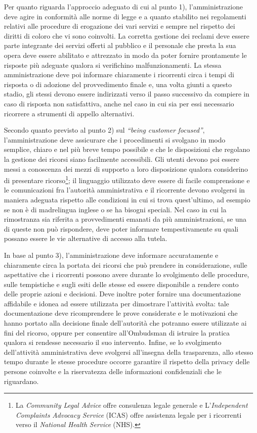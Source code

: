 \documentclass[12pt,it,a4paper,]{report}
\begin{document}
Per quanto riguarda l'approccio adeguato di cui al punto 1),
l'amministrazione deve agire in conformità alle norme di legge e a
quanto stabilito nei regolamenti relativi alle procedure di erogazione
dei vari servizi e sempre nel rispetto dei diritti di coloro che vi sono
coinvolti. La corretta gestione dei reclami deve essere parte integrante
dei servizi offerti al pubblico e il personale che presta la sua opera
deve essere abilitato e attrezzato in modo da poter fornire prontamente
le risposte più adeguate qualora si verifichino malfunzionamenti. La
stessa amministrazione deve poi informare chiaramente i ricorrenti circa
i tempi di risposta o di adozione del provvedimento finale e, una volta
giunti a questo stadio, gli stessi devono essere indirizzati verso il
passo successivo da compiere in caso di risposta non satisfattiva, anche
nel caso in cui sia per essi necessario ricorrere a strumenti di appello
alternativi.

Secondo quanto previsto al punto 2) sul \emph{``being customer
focused''}, l'amministrazione deve assicurare che i procedimenti si
svolgano in modo semplice, chiaro e nel più breve tempo possibile e che
le disposizioni che regolano la gestione dei ricorsi siano facilmente
accessibili. Gli utenti devono poi essere messi a conoscenza dei mezzi
di supporto a loro disposizione qualora considerino di presentare
ricorso\footnote{La \emph{Community Legal Advice} offre consulenza
  legale generale e L'\emph{Independent Complaints Advocacy Service}
  (ICAS) offre assistenza legale per i ricorrenti verso il
  \emph{National Health Service} (NHS).}; il linguaggio utilizzato deve
essere di facile comprensione e le comunicazioni fra l'autorità
amministrativa e il ricorrente devono svolgersi in maniera adeguata
rispetto alle condizioni in cui si trova quest'ultimo, ad esempio se non
è di madrelingua inglese o se ha bisogni speciali. Nel caso in cui la
rimostranza sia riferita a provvedimenti emanati da più amministrazioni,
se una di queste non può rispondere, deve poter informare
tempestivamente su quali possano essere le vie alternative di accesso
alla tutela.

In base al punto 3), l'amministrazione deve informare accuratamente e
chiaramente circa la portata dei ricorsi che può prendere in
considerazione, sulle aspettative che i ricorrenti possono avere durante
lo svolgimento delle procedure, sulle tempistiche e sugli esiti delle
stesse ed essere disponibile a rendere conto delle proprie azioni e
decisioni. Deve inoltre poter fornire una documentazione affidabile e
idonea ad essere utilizzata per dimostrare l'attività svolta: tale
documentazione deve ricomprendere le prove considerate e le motivazioni
che hanno portato alla decisione finale dell'autorità che potranno
essere utilizzate ai fini del ricorso, oppure per consentire
all'Ombudsman di istruire la pratica qualora si rendesse necessario il
suo intervento. Infine, se lo svolgimento dell'attività amministrativa
deve svolgersi all'insegna della trasparenza, allo stesso tempo durante
le stesse procedure occorre garantire il rispetto della privacy delle
persone coinvolte e la riservatezza delle informazioni confidenziali che
le riguardano.
\end{document}
